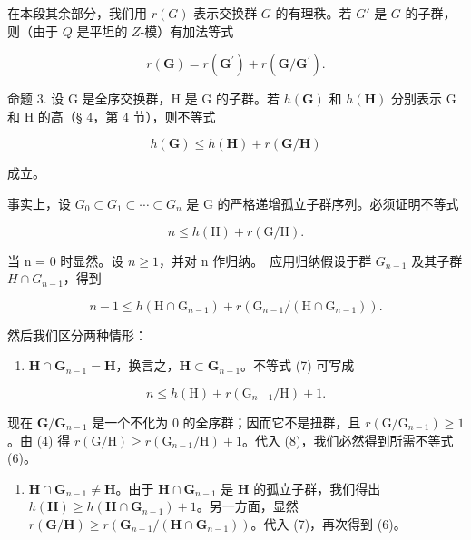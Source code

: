 在本段其余部分，我们用 \(r(G)\) 表示交换群 \(G\) 的有理秩。若 \(G'\) 是 \(G\) 的子群，则（由于 \(Q\) 是平坦的 \(Z\)-模）有加法等式

\[
r (\mathbf {G}) = r \left(\mathbf {G} ^ {\prime}\right) + r \left(\mathbf {G} / \mathbf {G} ^ {\prime}\right).\tag{4}
\]

命题 3. 设 G 是全序交换群，H 是 G 的子群。若 \(h(\mathbf{G})\) 和 \(h(\mathbf{H})\) 分别表示 G 和 H 的高（§ 4，第 4 节），则不等式

\[
h (\mathbf {G}) \leqslant h (\mathbf {H}) + r (\mathbf {G} / \mathbf {H})\tag{5}
\]

成立。

事实上，设 \(G_{0} \subset G_{1} \subset \cdots \subset G_{n}\) 是 G 的严格递增孤立子群序列。必须证明不等式

\[
n \leqslant h (\mathrm{H}) + r (\mathrm{G} / \mathrm{H}).\tag{6}
\]

当 n = 0 时显然。设 \(n \geqslant 1\)，并对 n 作归纳。~应用归纳假设于群 \(G_{n-1}\) 及其子群 \(H \cap G_{n-1}\)，得到

\[
n - 1 \leqslant h (\mathrm{H} \cap \mathrm{G} _ {n - 1}) + r (\mathrm{G} _ {n - 1} / (\mathrm{H} \cap \mathrm{G} _ {n - 1})).\tag{7}
\]

然后我们区分两种情形：

\begin{enumerate}
\def\labelenumi{(\alph{enumi})}
\tightlist
\item
  \(\mathbf{H} \cap \mathbf{G}_{n-1} = \mathbf{H}\)，换言之，\(\mathbf{H} \subset \mathbf{G}_{n-1}\)。不等式 (7) 可写成
\end{enumerate}

\[
n \leqslant h (\mathrm{H}) + r (\mathrm{G} _ {n - 1} / \mathrm{H}) + 1.\tag{8}
\]

现在 \(\mathbf{G} / \mathbf{G}_{n - 1}\) 是一个不化为 0 的全序群；因而它不是扭群，且 \(r(\mathrm{G} / \mathrm{G}_{n - 1}) \geqslant 1\)。由 (4) 得 \(r(\mathrm{G} / \mathrm{H}) \geqslant r(\mathrm{G}_{n - 1} / \mathrm{H}) + 1\)。代入 (8)，我们必然得到所需不等式 (6)。

\begin{enumerate}
\def\labelenumi{(\alph{enumi})}
\setcounter{enumi}{1}
\tightlist
\item
  \(\mathbf{H} \cap \mathbf{G}_{n-1} \neq \mathbf{H}\)。由于 \(\mathbf{H} \cap \mathbf{G}_{n-1}\) 是 \(\mathbf{H}\) 的孤立子群，我们得出 \(h(\mathbf{H}) \geqslant h(\mathbf{H} \cap \mathbf{G}_{n-1}) + 1\)。另一方面，显然 \(r(\mathbf{G}/\mathbf{H}) \geqslant r(\mathbf{G}_{n-1}/(\mathbf{H} \cap \mathbf{G}_{n-1}))\)。代入 (7)，再次得到 (6)。
\end{enumerate}

